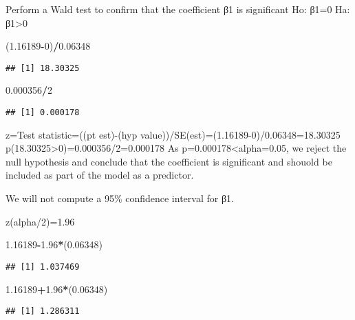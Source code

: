 \documentclass[]{article}
\newenvironment{Shaded}{\begin{snugshade}}{\end{snugshade}}
\newcommand{\DecValTok}[1]{\textcolor[rgb]{0.00,0.00,0.81}{#1}}
\newcommand{\FloatTok}[1]{\textcolor[rgb]{0.00,0.00,0.81}{#1}}
\newcommand{\OperatorTok}[1]{\textcolor[rgb]{0.81,0.36,0.00}{\textbf{#1}}}
\newcommand{\NormalTok}[1]{#1}
\begin{document}
Perform a Wald test to confirm that the coefficient β1 is significant
Ho: β1=0 Ha: β1\textgreater{}0

\begin{Shaded}
\begin{Highlighting}[]
\NormalTok{(}\FloatTok{1.16189}\OperatorTok{-}\DecValTok{0}\NormalTok{)}\OperatorTok{/}\FloatTok{0.06348}
\end{Highlighting}
\end{Shaded}

\begin{verbatim}
## [1] 18.30325
\end{verbatim}

\begin{Shaded}
\begin{Highlighting}[]
\FloatTok{0.000356}\OperatorTok{/}\DecValTok{2}
\end{Highlighting}
\end{Shaded}

\begin{verbatim}
## [1] 0.000178
\end{verbatim}

z=Test statistic=((pt est)-(hyp
value))/SE(est)=(1.16189-0)/0.06348=18.30325
p(18.30325\textgreater{}0)=0.000356/2=0.000178 As
p=0.000178\textless{}alpha=0.05, we reject the null hypothesis and
conclude that the coefficient is significant and shouold be included as
part of the model as a predictor.

We will not compute a 95\% confidence interval for β1.

z(alpha/2)=1.96

\begin{Shaded}
\begin{Highlighting}[]
\FloatTok{1.16189}\OperatorTok{-}\FloatTok{1.96}\OperatorTok{*}\NormalTok{(}\FloatTok{0.06348}\NormalTok{)}
\end{Highlighting}
\end{Shaded}

\begin{verbatim}
## [1] 1.037469
\end{verbatim}

\begin{Shaded}
\begin{Highlighting}[]
\FloatTok{1.16189}\OperatorTok{+}\FloatTok{1.96}\OperatorTok{*}\NormalTok{(}\FloatTok{0.06348}\NormalTok{)}
\end{Highlighting}
\end{Shaded}

\begin{verbatim}
## [1] 1.286311
\end{verbatim}
\end{document}
